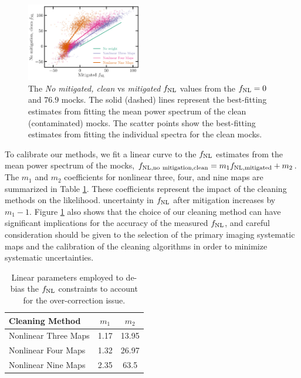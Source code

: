 \begin{figure}
\centering
\includegraphics[width=0.45\textwidth]{figures/fnlbias}
\caption{The \textit{No mitigated, clean} vs \textit{mitigated} $f_{\rm NL}$ values from the $f_{\rm NL}=0$ and $76.9$ mocks. The solid (dashed) lines represent the best-fitting estimates from fitting the mean power spectrum of the clean (contaminated) mocks. The scatter points show the best-fitting estimates from fitting the individual spectra for the clean mocks.}\label{fig:fnlbias}
\end{figure}

To calibrate our methods, we fit a linear curve to the $f_{\rm NL}$ estimates from the mean power spectrum of the mocks, $f_{\rm NL, no~mitigation, clean} = m_{1} f_{\rm NL, mitigated} + m_{2}$. The $m_{1}$ and $m_{2}$ coefficients for nonlinear three, four, and nine maps are summarized in Table \ref{tab:debiasparams}. These coefficients represent the impact of the cleaning methods on the likelihood.  uncertainty in $f_{\rm NL}$ after mitigation increases by $m_{1}-1$. Figure \ref{fig:fnlbias} also shows that the choice of our cleaning method can have significant implications for the accuracy of the measured $f_{\rm NL}$, and careful consideration should be given to the selection of the primary imaging systematic maps and the calibration of the cleaning algorithms in order to minimize systematic uncertainties.


\begin{table}
\begin{center}
\caption{Linear parameters employed to de-bias the $f_{\rm NL}$ constraints to account for the over-correction issue.
}\label{tab:debiasparams}
\begin{tabular}{lcc}
\hline
\hline
\textbf{Cleaning Method} & $m_{1}$ & $m_{2}$ \\
\hline
Nonlinear Three Maps & 1.17 & 13.95 \\
Nonlinear Four Maps & 1.32 & 26.97 \\
Nonlinear Nine Maps & 2.35 & 63.5\\
\hline
\end{tabular}
\end{center}
\end{table}
